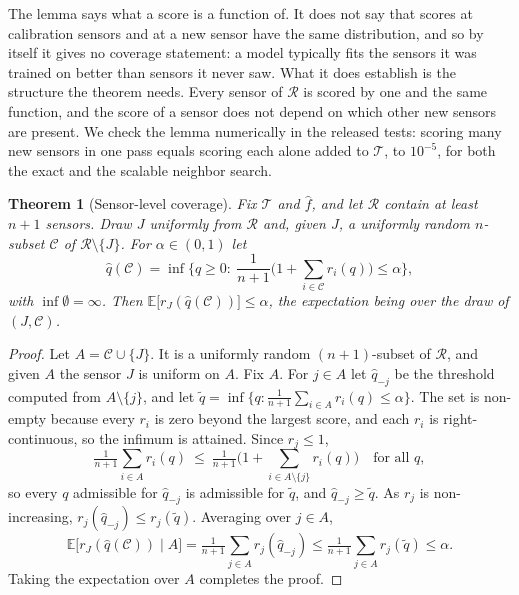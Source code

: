 \documentclass[journal,twoside,web]{ieeecolor}
\newtheorem{theorem}{Theorem}
\newcommand{\Risk}{r}
\begin{document}
The lemma says what a score is a function of. It does not say that scores at calibration sensors
and at a new sensor have the same distribution, and so by itself it gives no coverage statement:
a model typically fits the sensors it was trained on better than sensors it never saw. What it does
establish is the structure the theorem needs. Every sensor of $\mathcal{R}$ is scored by one and the
same function, and the score of a sensor does not depend on which other new sensors are present.
We check the lemma numerically in the released tests: scoring many new sensors in one pass equals
scoring each alone added to $\mathcal{T}$, to $10^{-5}$, for both the exact and the scalable
neighbor search.

\begin{theorem}[Sensor-level coverage]
\label{thm:coverage}
Fix $\mathcal{T}$ and $\hat f$, and let $\mathcal{R}$ contain at least $n+1$ sensors. Draw $J$
uniformly from $\mathcal{R}$ and, given $J$, a uniformly random $n$-subset $\mathcal{C}$ of
$\mathcal{R}\setminus\{J\}$. For $\alpha\in(0,1)$ let
\begin{equation}
\hat q(\mathcal{C})=\inf\Big\{q\ge 0:\ \frac{1}{n+1}\Big(1+\sum_{i\in\mathcal{C}}\Risk_i(q)\Big)\le\alpha\Big\},
\end{equation}
with $\inf\emptyset=\infty$. Then $\mathbb{E}\big[\Risk_J(\hat q(\mathcal{C}))\big]\le\alpha$, the
expectation being over the draw of $(J,\mathcal{C})$.
\end{theorem}
\begin{proof}
Let $A=\mathcal{C}\cup\{J\}$. It is a uniformly random $(n+1)$-subset of $\mathcal{R}$, and given $A$
the sensor $J$ is uniform on $A$. Fix $A$. For $j\in A$ let $\hat q_{-j}$ be the threshold computed from
$A\setminus\{j\}$, and let $\tilde q=\inf\{q:\frac{1}{n+1}\sum_{i\in A}\Risk_i(q)\le\alpha\}$. The set
is non-empty because every $\Risk_i$ is zero beyond the largest score, and each $\Risk_i$ is
right-continuous, so the infimum is attained. Since $\Risk_j\le 1$,
\[
\tfrac{1}{n+1}\textstyle\sum_{i\in A}\Risk_i(q)\ \le\ \tfrac{1}{n+1}\big(1+\sum_{i\in A\setminus\{j\}}\Risk_i(q)\big)\quad\text{for all }q,
\]
so every $q$ admissible for $\hat q_{-j}$ is admissible for $\tilde q$, and $\hat q_{-j}\ge\tilde q$.
As $\Risk_j$ is non-increasing, $\Risk_j(\hat q_{-j})\le\Risk_j(\tilde q)$. Averaging over $j\in A$,
\[
\mathbb{E}\big[\Risk_J(\hat q(\mathcal{C}))\mid A\big]=\tfrac{1}{n+1}\textstyle\sum_{j\in A}\Risk_j(\hat q_{-j})
\le\tfrac{1}{n+1}\sum_{j\in A}\Risk_j(\tilde q)\le\alpha .
\]
Taking the expectation over $A$ completes the proof. \end{proof}
\end{document}
